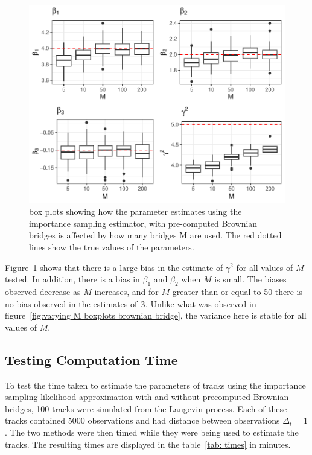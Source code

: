 \begin{figure}[H]
    \centering
    \includegraphics[width=\linewidth]{Images/Results/varying M estimates boxplot precomputed BB.pdf}
    \caption[Box plots of Parameter Estimates using pre-computed Brownian bridge importance sampling using different numbers of bridges]{box plots showing how the parameter estimates using the importance sampling estimator, with pre-computed Brownian bridges is affected by how many bridges M are used. The red dotted lines show the true values of the parameters.}
    \label{fig:varying M boxplots precomputed brownian bridge}
\end{figure}

Figure~\ref{fig:varying M boxplots precomputed brownian bridge} shows that there is a large bias in the estimate of $\gamma^2$ for all values of $M$ tested. In addition, there is a bias in $\beta_1$ and $\beta_2$ when $M$ is small. The biases observed decrease as $M$ increases, and for $M$ greater than or equal to 50 there is no bias observed in the estimates of $\bm \beta$. Unlike what was observed in figure~\ref{fig:varying M boxplots brownian bridge}, the variance here is stable for all values of $M$.


\subsection{Testing Computation Time}
\label{subsec: computation time}
To test the time taken to estimate the parameters of tracks using the importance sampling likelihood approximation with and without precomputed Brownian bridges, 100 tracks were simulated from the Langevin process. Each of these tracks contained 5000 observations and had distance between observations $\Delta_t = 1$. The two methods were then timed while they were being used to estimate the tracks. The resulting times are displayed in the table~\ref{tab: times} in minutes.



